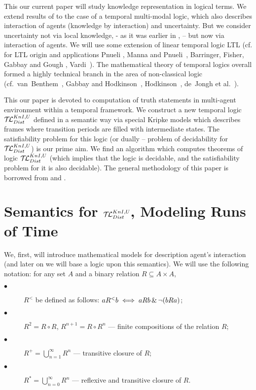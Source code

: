 \documentclass[runningheads]{llncs}
\begin{document}
This our current paper will study knowledge representation in logical terms.
We extend  results of \cite{vris}  to the case of a temporal multi-modal logic,
which also describes interaction of agents (knowledge by
interaction) and uncertainty. But we consider uncertainty  not via local knowledge, - as it was earlier in \cite{vris}, -- but now
via interaction of agents. We will use some extension of linear temporal  logic LTL
(cf. for LTL origin and applications
  Pnueli \cite{pnu},
 Manna and Pnueli~\cite{mp1},
  Barringer, Fisher, Gabbay and  Gough \cite{bf},
 Vardi~\cite{var3}).
  The mathematical theory
of temporal logics overall formed a highly technical branch in
the area of non-classical logic
 (cf.~van~Benthem~\cite{vb31,vb32},
  Gabbay and Hodkinson~\cite{gh1}, Hodkinson~\cite{hod1},
   de~Jongh et al.~\cite{ddj1}).

This our paper is devoted to computation of truth statements in multi-agent environment
within a temporal framework.
  We construct a new temporal logic $\mathcal{T\!L}^{KnI,U}_{Dist}$ defined in a semantic
 way via special Kripke models
  which describes frames where transition periods are filled
  with intermediate states.
   The
  satisfiability problem for this logic (or dually -- problem of
  decidability for $\mathcal{T\!L}^{KnI,U}_{Dist}$) is our prime aim.
 We find  an algorithm which computes theorems of logic $\mathcal{T\!L}^{KnI,U}_{Dist}$
(which implies that the logic is decidable, and the satisfiability problem
for it is also decidable).
 The general methodology of this paper
is borrowed from \cite{rit07} and
\cite{vris,DBLP:journals/logcom/Rybakov09}.




\section{Semantics for $\mathcal{T\!L}^{KnI,U}_{Dist}$, Modeling Runs of Time}

We, first, will introduce mathematical models for description agent's interaction
(and later on we will base a logic upon this semantics). We will use the following notation: 
 for
any set $A$ and a binary relation $R\subseteq A\times A$,

\begin{description}
    \item[$\bullet$]
$R^<$ be defined as follows:
 $a R^< b\iff aRb \,\&\, \neg(bRa)$;
      \medskip
    \item [$\bullet$]
  $R^2=R\circ R$, $R^{n+1}=R\circ R^n$ --- finite compositions of the relation $R$;
      \medskip
    \item[$\bullet$]
  $R^+=\bigcup_{n=1}^\infty R^n$ --- transitive closure of $R$;
      \medskip
    \item[$\bullet$]
  $R^*=\bigcup_{n=0}^\infty R^n$ --- reflexive and transitive
  closure of $R$.
    \end{description}
\end{document}

